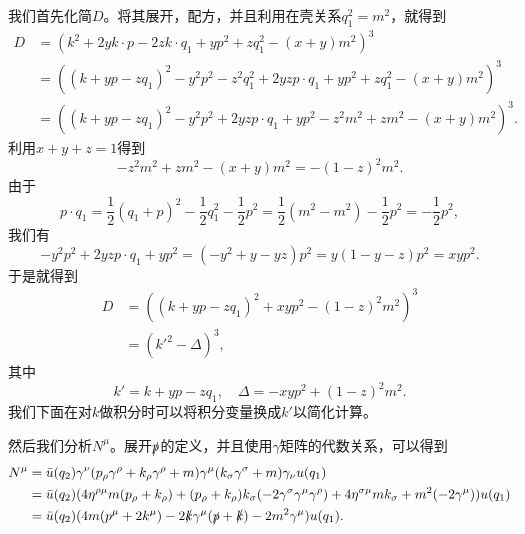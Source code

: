 \documentclass[hyperref, UTF8, a4paper]{ctexart}
\begin{document}
我们首先化简$D$。将其展开，配方，并且利用在壳关系$q_1^2=m^2$，就得到
\[
    \begin{aligned}
        D &= (k^2 + 2y k \cdot p - 2z k \cdot q_1 + yp^2 + zq_1^2 - (x + y)m^2)^3 \\
        &= ((k + yp - z q_1)^2 - y^2 p^2 - z^2 q_1^2 + 2 yz p \cdot q_1 + y p^2 + z q_1^2 - (x + y) m^2)^3 \\
        &= ((k + yp - z q_1)^2 - y^2 p^2 + 2 yz p \cdot q_1 + y p^2 - z^2 m^2 + z m^2 - (x + y) m^2)^3.
    \end{aligned}
\]
利用$x + y + z = 1$得到
\[
    - z^2 m^2 + z m^2 - (x + y) m^2 = - (1-z)^2 m^2.
\]
由于
\[
    p \cdot q_1 = \frac{1}{2} (q_1 + p)^2 - \frac{1}{2} q_1^2 - \frac{1}{2} p^2 = \frac{1}{2} (m^2 - m^2) - \frac{1}{2} p^2 = - \frac{1}{2} p^2,
\]
我们有
\[
    - y^2 p^2 + 2 yz p \cdot q_1 + y p^2 = (-y^2 + y - yz) p^2 = y(1 - y - z) p^2 = xy p^2.
\]
于是就得到
\begin{equation}
    \begin{aligned}
        D &= ((k + yp - z q_1)^2 + xy p^2 - (1-z)^2 m^2)^3 \\
        &= (k'^2 - \Delta)^3,
    \end{aligned}
\end{equation}
其中
\begin{equation}
    k' = k + yp - z q_1, \quad \Delta = - xy p^2 + (1-z)^2 m^2.
\end{equation}
我们下面在对$k$做积分时可以将积分变量换成$k'$以简化计算。

然后我们分析$N^\mu$。展开$\slashed{p}$的定义，并且使用$\gamma$矩阵的代数关系，可以得到
\begin{equation}
    \begin{aligned}
        N^\mu &= \bar{u}(q_2) \gamma^\nu (p_\rho \gamma^\rho + k_\rho \gamma^\rho + m) \gamma^\mu (k_\sigma \gamma^\sigma + m) \gamma_\nu u(q_1) \\
        &= \bar{u}(q_2) (4 \eta^{\rho \mu} m (p_\rho + k_\rho) + (p_\rho + k_\rho) k_\sigma (- 2 \gamma^\sigma \gamma^\mu \gamma^\rho) + 4 \eta^{\sigma \mu} m k_\sigma + m^2 (-2 \gamma^\mu)) u(q_1) \\
        &= \bar{u}(q_2) (4 m (p^\mu + 2 k^\mu) - 2 \slashed{k} \gamma^\mu (\slashed{p} + \slashed{k}) - 2 m^2 \gamma^\mu) u(q_1).
    \end{aligned}
\end{equation}
\end{document}
